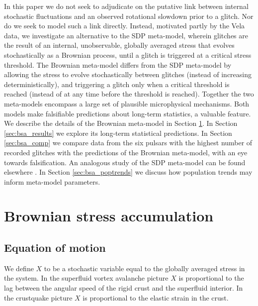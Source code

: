 In this paper we do not seek to adjudicate on the putative link between internal stochastic fluctuations and an observed rotational slowdown prior to a glitch. Nor do we seek to model such a link directly. Instead, motivated partly by the Vela data, we investigate an alternative to the SDP meta-model, wherein glitches are the result of an internal, unobservable, globally averaged stress that evolves stochastically as a Brownian process, until a glitch is triggered at a critical stress threshold. The Brownian meta-model differs from the SDP meta-model by allowing the stress to evolve stochastically between glitches (instead of increasing deterministically), and triggering a glitch only when a critical threshold is reached (instead of at any time before the threshold is reached). Together the two meta-models encompass a large set of plausible microphysical mechanisms. Both models make falsifiable predictions about long-term statistics, a valuable feature. We describe the details of the Brownian meta-model in Section \ref{sec:bsa_bm_meta}. In Section \ref{sec:bsa_results} we explore its long-term statistical predictions. In Section \ref{sec:bsa_comp} we compare data from the six pulsars with the highest number of recorded glitches with the predictions of the Brownian meta-model, with an eye towards falsification. An analogous study of the SDP meta-model can be found elsewhere \citep{Melatos2018,Carlin2019quasi,Carlin2019ac}. In Section \ref{sec:bsa_poptrends} we discuss how population trends may inform meta-model parameters.

\section{Brownian stress accumulation}
\label{sec:bsa_bm_meta}
\subsection{Equation of motion}
\label{sec:bsa_eom}
We define $X$ to be a stochastic variable equal to the globally averaged stress in the system. In the superfluid vortex avalanche picture $X$ is proportional to the lag between the angular speed of the rigid crust and the superfluid interior. In the crustquake picture $X$ is proportional to the elastic strain in the crust.

